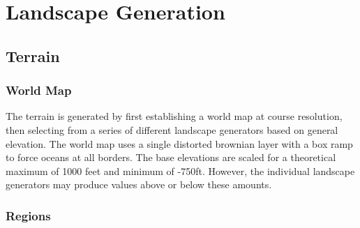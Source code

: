 
\chapter{Landscape Generation}

\section {Terrain}

\subsection{World Map}

The terrain is generated by first establishing a world map at course resolution, then selecting from a series of different landscape generators based on general elevation.
The world map uses a single distorted brownian layer with a box ramp to force oceans at all borders.
The base elevations are scaled for a theoretical maximum of 1000 feet and minimum of -750ft.
However, the individual landscape generators may produce values above or below these amounts.

\subsection{Regions}
